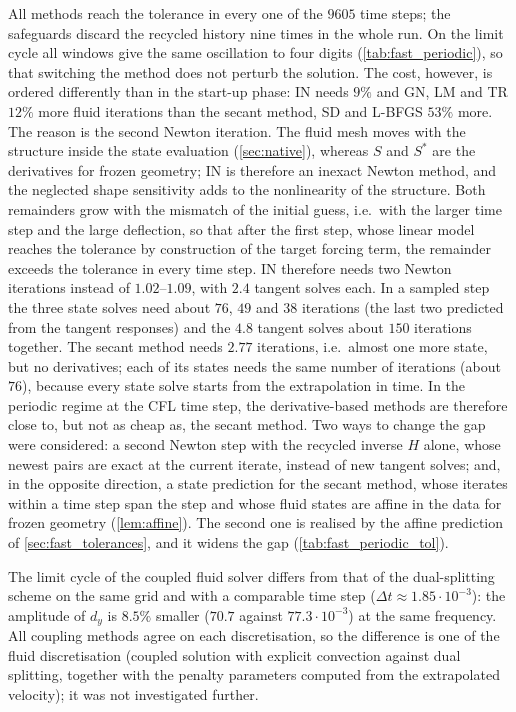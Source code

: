 \documentclass[11pt,a4paper]{article}
\theoremstyle{definition}
\theoremstyle{remark}
\begin{document}
All methods reach the tolerance in every one of the $9605$ time steps; the safeguards discard the
recycled history nine times in the whole run. On the limit cycle all windows give the same
oscillation to four digits (\cref{tab:fast_periodic}), so that switching the method does not
perturb the solution. The cost, however, is ordered differently than in the start-up phase: IN
needs $9\%$ and GN, LM and TR $12\%$ more fluid iterations than the secant method, SD and L-BFGS
$53\%$ more. The reason is the second Newton iteration. The fluid mesh moves with the structure
inside the state evaluation (\cref{sec:native}), whereas $S$ and $S^*$ are the derivatives for
frozen geometry; IN is therefore an inexact Newton method, and the neglected shape sensitivity adds
to the nonlinearity of the structure. Both remainders grow with the mismatch of the initial guess,
i.e.\ with the larger time step and the large deflection, so that after the first step, whose linear
model reaches the tolerance by construction of the target forcing term, the remainder exceeds the
tolerance in every time step. IN therefore needs
two Newton iterations instead of $1.02$--$1.09$, with $2.4$ tangent solves each. In a sampled step
the three state solves need about $76$, $49$ and $38$ iterations (the last two predicted from the
tangent responses) and the $4.8$ tangent solves about $150$ iterations together. The secant method
needs $2.77$ iterations, i.e.\ almost one more state, but no derivatives; each of its states needs
the same number of iterations (about $76$), because every state solve starts from the
extrapolation in time. In the periodic regime at the CFL time step, the derivative-based methods are
therefore close to, but not as cheap as, the secant method. Two ways to change the gap were
considered: a second Newton step with the recycled inverse $H$ alone, whose newest pairs are exact
at the current iterate, instead of new tangent solves; and, in the opposite direction, a state
prediction for the secant method, whose iterates within a time step span the step and whose fluid
states are affine in the data for frozen geometry (\cref{lem:affine}). The second one is realised
by the affine prediction of \cref{sec:fast_tolerances}, and it widens the gap
(\cref{tab:fast_periodic_tol}).

The limit cycle of the coupled fluid solver differs from that of the dual-splitting scheme on the
same grid and with a comparable time step ($\Delta t\approx1.85\cdot10^{-3}$): the amplitude of
$d_y$ is $8.5\%$ smaller ($70.7$ against $77.3\cdot10^{-3}$) at the same frequency. All coupling
methods agree on each discretisation, so the difference is one of the fluid discretisation
(coupled solution with explicit convection against dual splitting, together with the penalty
parameters computed from the extrapolated velocity); it was not investigated further.
\end{document}
